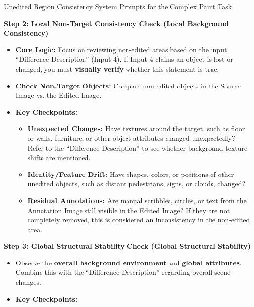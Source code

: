 \begin{promptbox}[label={System Prompts: URC_Complex_paint}]{Unedited Region Consistency System Prompts for the Complex Paint Task}
\medskip

\textbf{Step 2: Local Non-Target Consistency Check (Local Background Consistency)}

\begin{itemize}[leftmargin=2.2em, labelsep=0.5em, itemsep=2pt]
    \item \textbf{Core Logic:} Focus on reviewing non-edited areas based on the input ``Difference Description'' (Input 4). If Input 4 claims an object is lost or changed, you must \textbf{visually verify} whether this statement is true.
    
    \item \textbf{Check Non-Target Objects:} Compare non-edited objects in the Source Image vs. the Edited Image.
    
    \item \textbf{Key Checkpoints:}
    
    \begin{itemize}[leftmargin=2.2em, labelsep=0.5em, itemsep=2pt]
        \item \textbf{Unexpected Changes:} Have textures around the target, such as floor or walls, furniture, or other object attributes changed unexpectedly? Refer to the ``Difference Description'' to see whether background texture shifts are mentioned.
        
        \item \textbf{Identity/Feature Drift:} Have shapes, colors, or positions of other unedited objects, such as distant pedestrians, signs, or clouds, changed?
        
        \item \textbf{Residual Annotations:} Are manual scribbles, circles, or text from the Annotation Image still visible in the Edited Image? If they are not completely removed, this is considered an inconsistency in the non-edited area.
    \end{itemize}
\end{itemize}

\medskip

\textbf{Step 3: Global Structural Stability Check (Global Structural Stability)}

\begin{itemize}[leftmargin=2.2em, labelsep=0.5em, itemsep=2pt]
    \item Observe the \textbf{overall background environment} and \textbf{global attributes}. Combine this with the ``Difference Description'' regarding overall scene changes.
    
    \item \textbf{Key Checkpoints:}
    

\end{itemize}
\end{promptbox}
